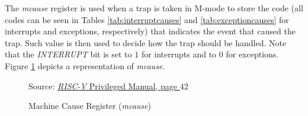 The \textit{mcause} register is used when a trap is taken in M-mode to store the
code (all codes can be seen in Tables \ref{tab:interruptcauses} and \ref{tab:exceptioncauses}
for interrupts and exceptions, respectively) that indicates the event that caused
the trap. Such value is then used to decide how the trap should be handled. Note
that the \textit{INTERRUPT} bit is set to $1$ for interrupts and to $0$ for
exceptions. Figure \ref{fig:mcause} depicts a representation of \textit{mcause}.
\\
\begin{figure}[H]
  \centering
  \def\stackalignment{r} %
  {\scriptsize Source: \href{https://drive.google.com/file/d/17GeetSnT5wW3xNuAHI95-SI1gPGd5sJ_/view}{\textit{RISC-V} Privileged Manual, page $42$}}
  \caption{Machine Cause Register (\textit{mcause})}
  \label{fig:mcause}
\end{figure}

